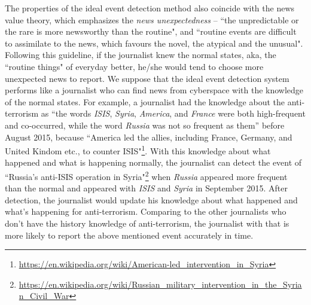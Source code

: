 \documentclass[conference,compsoc]{IEEEtran}
\begin{document}
The properties of the ideal event detection method also coincide with the news value theory\cite{galtung1965structure}\cite{caple2013delving}, which emphasizes the \textit{news unexpectedness} -- ``the unpredictable or the rare is more newsworthy than the routine"\cite{bell1991language}, and ``routine events are difficult to assimilate to the news, which favours the novel, the atypical and the unusual"\cite{montgomery2007discourse}.
Following this guideline, if the journalist knew the normal states, aka, the ``routine things" of everyday better, he/she would tend to choose more unexpected news to report. 
We suppose that the ideal event detection system performs like a journalist who can find news from cyberspace with the knowledge of the normal states. 
For example, a journalist had the knowledge about the anti-terrorism as ``the words \textit{ISIS}, \textit{Syria}, \textit{America}, and \textit{France} were both high-frequent and co-occurred, while the word \textit{Russia} was not so frequent as them'' before August 2015, because ``America led the allies, including France, Germany, and United Kindom etc., to counter ISIS"\footnote{\url{https://en.wikipedia.org/wiki/American-led_intervention_in_Syria}}.
With this knowledge about what happened and what is happening normally, the journalist can detect the event of ``Russia's anti-ISIS operation in Syria"\footnote{\url{https://en.wikipedia.org/wiki/Russian_military_intervention_in_the_Syrian_Civil_War}} when \textit{Russia} appeared more frequent than the normal and appeared with \textit{ISIS} and \textit{Syria} in September 2015. 
After detection, the journalist would update his knowledge about what happened and what's happening for anti-terrorism.
Comparing to the other journalists who don't have the history knowledge of anti-terrorism, the journalist with that is more likely to report the above mentioned event accurately in time. 
\end{document}
